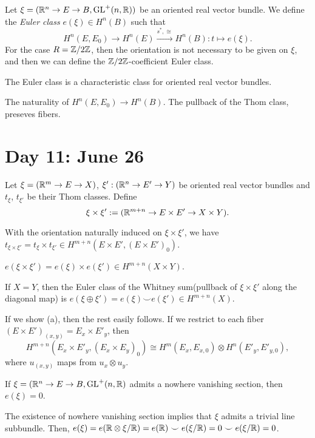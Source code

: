 \documentclass{../../../small}
\begin{document}
\begin{defn*}[4.7]
Let $\xi=(\mathbb{R}^n\to E\to B,\mathrm{GL}^+(n,\mathbb{R}))$ be an oriented real vector bundle.
We define the \emph{Euler class} $e(\xi)\in H^n(B)$ such that \[H^n(E,E_0)\to H^n(E)\xrightarrow{s^*,\cong}H^n(B):t\mapsto e(\xi).\]
For the case $R=\mathbb{Z}/2\mathbb{Z}$, then the orientation is not necessary to be given on $\xi$, and then we can define the $\mathbb{Z}/2\mathbb{Z}$-coefficient Euler class.
\end{defn*}

\begin{thm*}[4.8]
The Euler class is a characteristic class for oriented real vector bundles.
\end{thm*}
\begin{pf}
The naturality of $H^n(E,E_0)\to H^n(B)$.
The pullback of the Thom class, preseves fibers.
\end{pf}




\newpage
\section{Day 11: June 26}

\begin{prop*}[4.10]
Let $\xi=(\mathbb{R}^m\to E\to X)$, $\xi':(\mathbb{R}^n\to E'\to Y)$ be oriented real vector bundles and $t_\xi$, $t_{\xi'}$ be their Thom classes.
Define
\[\xi\times\xi':=(\mathbb{R}^{m+n}\to E\times E'\to X\times Y).\]
\begin{parts}
\item With the orientation naturally induced on $\xi\times\xi'$, we have $t_{\xi\times\xi'}=t_\xi\times t_{\xi'}\in H^{m+n}(E\times E',(E\times E')_0)$.
\item $e(\xi\times\xi')=e(\xi)\times e(\xi')\in H^{m+n}(X\times Y)$.
\item If $X=Y$, then the Euler class of the Whitney sum(pullback of $\xi\times\xi'$ along the diagonal map) is $e(\xi\oplus\xi')=e(\xi)\smile e(\xi')\in H^{m+n}(X)$.
\end{parts}
\end{prop*}
\begin{pf}
If we show (a), then the rest easily follows.
If we restrict to each fiber $(E\times E')_{(x,y)}=E_x\times E'_y$, then
\[H^{m+n}(E_x\times E'_y,(E_x\times E_y)_0)\cong H^m(E_x,E_{x,0})\otimes H^n(E'_y,E'_{y,0}),\]
where $u_{(x,y)}$ maps from $u_x\otimes u_y$.
\end{pf}

\begin{cor*}[4.11]
If $\xi=(\mathbb{R}^n\to E\to B,\mathrm{GL}^+(n,\mathbb{R})$ admits a nowhere vanishing section, then $e(\xi)=0$.
\end{cor*}
\begin{pf}
The existence of nowhere vanishing section implies that $\xi$ admits a trivial line subbundle.
Then, $e(\xi)=e(\mathbb{R}\otimes\xi/\mathbb{R})=e(\mathbb{R})\smile e(\xi/\mathbb{R})=0\smile e(\xi/\mathbb{R})=0$.
\end{pf}
\end{document}
